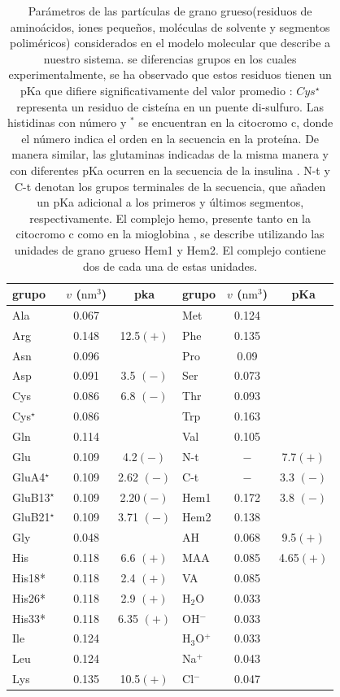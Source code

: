 \begin{table}[htb!]
	\centering
	\small
	\begin{tabular}{|lcc|lcc|}
		\hline
		grupo& $v$ ($\text{nm}^3$)& pka&  grupo& $v$ ($\text{nm}^3$)& pKa\\
		\hline
		Ala & 0.067 & & Met& 0.124& \\
		Arg & 0.148 & 12.5$ (+)$& Phe& 0.135& \\
		Asn & 0.096 & & Pro& 0.09& \\
		Asp & 0.091 & 3.5 $(-)$& Ser& 0.073& \\
		Cys & 0.086 & 6.8 $(-)$& Thr& 0.093& \\
		Cys$^\star$ & 0.086 & & Trp& 0.163& \\
		Gln & 0.114 & & Val& 0.105& \\
		Glu & 0.109 & 4.2$ (-)$& N-t& ${-}$& 7.7$ (+)$\\
		GluA4$^\star$ & 0.109 & 2.62 $(-)$& C-t& ${-}$& 3.3 $(-)$\\
		GluB13$^\star$ & 0.109 & 2.20$ (-)$& Hem1& 0.172& 3.8 $(-)$\\ 
		GluB21$^\star$ & 0.109 & 3.71 $(-)$& Hem2& 0.138& \\
		Gly & 0.048 & & AH& 0.068& 9.5$(+)$\\
		His & 0.118 & 6.6 $(+)$& MAA& 0.085& 4.65$(+)$\\ 
		His18* & 0.118 & 2.4 $(+)$& VA& 0.085& \\
		His26* & 0.118 & 2.9 $(+)$& H$_2$O& 0.033& \\
		His33*& 0.118& 6.35 $(+)$& OH$^-$& 0.033&\\
		Ile& 0.124& & H$_3$O$^+$& 0.033&\\
		Leu& 0.124& & Na$^+$& 0.043&\\
		Lys& 0.135& 10.5$ (+)$& Cl$^-$& 0.047&\\
		\hline
	\end{tabular}
	\caption{Par\'ametros de las part\'iculas de  grano grueso(residuos de amino\'acidos, iones peque\~nos, mol\'eculas de solvente y segmentos polim\'ericos) considerados en el modelo molecular que describe a nuestro sistema.  se diferencias grupos en los cuales experimentalmente, se ha observado que estos residuos tienen un pKa que difiere significativamente del valor promedio \cite{grimsley2009summary}:  $Cys^\star$ representa un residuo de ciste\'ina en un puente di-sulfuro. Las histidinas con  n\'umero y  $^\ast$ se encuentran en la citocromo c, donde el n\'umero indica el orden en la secuencia en la prote\'ina. De manera similar, las glutaminas indicadas de la misma manera y con diferentes pKa ocurren en la secuencia de la insulina \cite{grimsley2009summary}. N-t y C-t denotan los grupos terminales de la secuencia, que a\~naden un pKa adicional a los primeros y \'ultimos segmentos, respectivamente. El complejo hemo, presente tanto en la citocromo c como en la mioglobina \cite{mirkin2008high,hubbard1990x}, se describe utilizando las unidades de grano grueso Hem1 y Hem2. El complejo contiene dos de cada una de estas unidades.}
	\label{table:Coarse-grain} 
\end{table}



